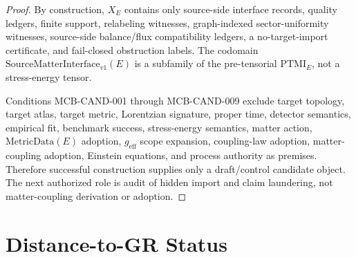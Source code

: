 \documentclass[11pt]{article}
\newcommand{\MetricData}{\mathrm{MetricData}}
\newcommand{\geff}{g_{\mathrm{eff}}}
\newcommand{\SMI}{\mathrm{SourceMatterInterface}_{v1}}
\newcommand{\PTMI}{\mathrm{PTMI}}
\begin{document}
\begin{proof}
By construction, \(X_E\) contains only source-side interface records, quality
ledgers, finite support, relabeling witnesses, graph-indexed
sector-uniformity witnesses, source-side balance/flux compatibility ledgers,
a no-target-import certificate, and fail-closed obstruction labels. The
codomain \(\SMI(E)\) is a subfamily of the pre-tensorial \(\PTMI_E\), not a
stress-energy tensor.

Conditions MCB-CAND-001 through MCB-CAND-009 exclude target topology, target
atlas, target metric, Lorentzian signature, proper time, detector semantics,
empirical fit, benchmark success, stress-energy semantics, matter action,
\(\MetricData(E)\) adoption, \(\geff\) scope expansion, coupling-law
adoption, matter-coupling adoption, Einstein equations, and process authority
as premises. Therefore successful construction supplies only a draft/control
candidate object. The next authorized role is audit of hidden import and
claim laundering, not matter-coupling derivation or adoption.
\end{proof}

\section{Distance-to-GR Status}
\end{document}
